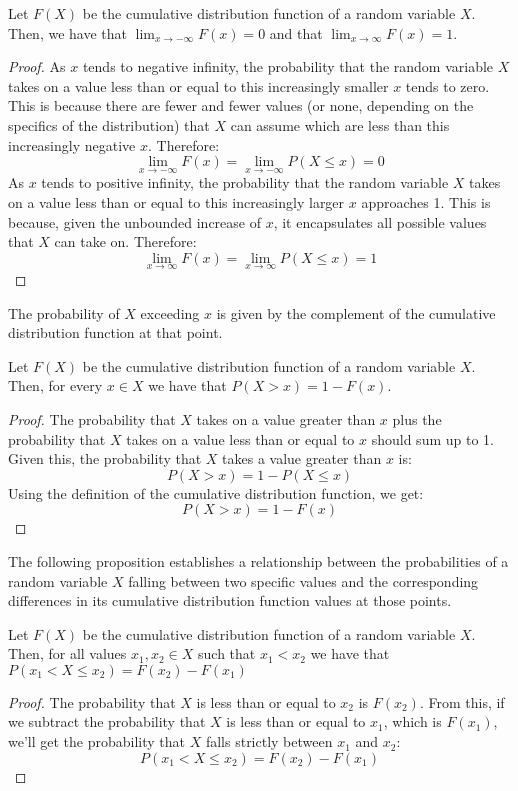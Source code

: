 \begin{proposition}
Let $F(X)$ be the cumulative distribution function of a random variable $X$. Then, we have that $\lim_{x\rightarrow-\infty}F\left(x\right)=0$ and that $\lim_{x\rightarrow\infty}F\left(x\right)=1$.
\end{proposition}
\begin{proof}
As $x$ tends to negative infinity, the probability that the random variable $X$ takes on a value less than or equal to this increasingly smaller $x$ tends to zero. This is because there are fewer and fewer values (or none, depending on the specifics of the distribution) that $X$ can assume which are less than this increasingly negative $x$. Therefore:
\[
\lim_{x \rightarrow -\infty} F(x) = \lim_{x \rightarrow -\infty} P(X \leq x) = 0 
\]
As $x$ tends to positive infinity, the probability that the random variable $X$ takes on a value less than or equal to this increasingly larger $x$ approaches 1. This is because, given the unbounded increase of $x$, it encapsulates all possible values that $X$ can take on. Therefore:
\[
\lim_{x \rightarrow \infty} F(x) = \lim_{x \rightarrow \infty} P(X \leq x) = 1
\]
\end{proof}

The probability of $X$ exceeding $x$ is given by the complement of the cumulative distribution function at that point.

\begin{proposition}
Let $F(X)$ be the cumulative distribution function of a random variable $X$. Then, for every $x \in X$ we have that $P\left(X>x\right)=1-F\left(x\right)$.
\end{proposition}
\begin{proof}
The probability that $X$ takes on a value greater than $x$ plus the probability that $X$ takes on a value less than or equal to $x$ should sum up to 1. Given this, the probability that $X$ takes a value greater than $x$ is:
\[
P(X > x) = 1 - P(X \leq x)
\]
Using the definition of the cumulative distribution function, we get:
\[
P(X > x) = 1 - F(x) 
\]
\end{proof}

The following proposition establishes a relationship between the probabilities of a random variable \( X \) falling between two specific values and the corresponding differences in its cumulative distribution function values at those points.

\begin{proposition}
Let $F(X)$ be the cumulative distribution function of a random variable $X$. Then, for all values $x_1, x_2 \in X$ such that $x_1 < x_2$ we have that $P\left(x_1 < X \leq x_2 \right) = F\left(x_2\right) - F\left(x_1\right)$
\end{proposition}
 \begin{proof}
The probability that $X$ is less than or equal to $x_2$ is $F(x_2)$. From this, if we subtract the probability that $X$ is less than or equal to $x_1$, which is $F(x_1)$, we'll get the probability that $X$ falls strictly between $x_1$ and $x_2$:
\[
P(x_1 < X \leq x_2) = F(x_2) - F(x_1)
\]
\end{proof}

